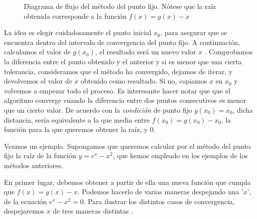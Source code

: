 \begin{figure}[h]
\centering
{}
\caption{Diagrama de flujo del método del punto fijo. Nótese que la raíz obtenida corresponde a la función $f(x)=g(x)-x$}
\label{fig:pfijo1}
\end{figure}

 La idea es elegir cuidadosamente el punto inicial $x_0$, para asegurar que se encuentra dentro del intervalo de convergencia del punto fijo.  A continuación, calculamos el valor de $g(x_0)$, el resultado será un nuevo valor  $x$ .  Comprobamos la diferencia entre el punto obtenido y el anterior y si es menor que una cierta tolerancia,  consideramos que el método ha convergido, dejamos de iterar, y devolvemos el valor de $x$ obtenido como resultado. Si no, copiamos $x$ en $x_0$ y volvemos a empezar todo el proceso. Es interesante hacer notar que que el algoritmo converge cuando la diferencia entre dos puntos consecutivos es menor que un cierto valor.  De acuerdo con la \emph{condición } de punto fijo $g(x_0)=x_0$, dicha distancia, sería equivalente a la que media entre $f(x_0)=g(x_0)-x_0$, la función para la que queremos obtener la raíz,   y $0$.

Veamos un ejemplo. Supongamos  que queremos calcular por el método del punto fijo la raíz de la  
función $y=e^x-x^2$, que hemos empleado en los ejemplos de los métodos anteriores.

En primer lugar, debemos obtener a partir de ella una nueva función que cumpla que $f(x)=g(x)-x$. Podemos hacerlo de varias maneras despejando una '$x$', de la ecuación $e^x-x^2=0$.  Para ilustrar los distintos casos de convergencia, despejaremos $x$ de tres maneras distintas .

